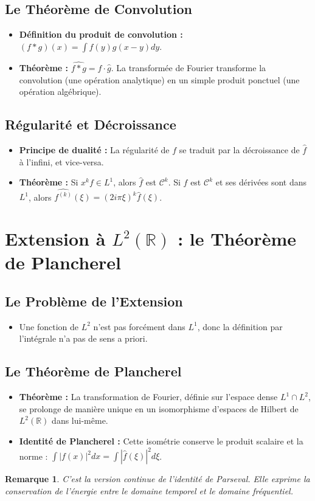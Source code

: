 \documentclass[12pt, a4paper, parskip=full]{report}
\theoremstyle{agregstyle}
\newtheorem{remark}[definition]{Remarque}
\begin{document}
\subsection{Le Théorème de Convolution}
\begin{itemize}
    \item \textbf{Définition du produit de convolution :} $(f*g)(x) = \int f(y)g(x-y)dy$.
    \item \textbf{Théorème :} $\widehat{f*g} = \hat{f} \cdot \hat{g}$. La transformée de Fourier transforme la convolution (une opération analytique) en un simple produit ponctuel (une opération algébrique).
\end{itemize}
\subsection{Régularité et Décroissance}
\begin{itemize}
    \item \textbf{Principe de dualité :} La régularité de $f$ se traduit par la décroissance de $\hat{f}$ à l'infini, et vice-versa.
    \item \textbf{Théorème :} Si $x^k f \in L^1$, alors $\hat{f}$ est $\mathcal{C}^k$. Si $f$ est $\mathcal{C}^k$ et ses dérivées sont dans $L^1$, alors $\widehat{f^{(k)}}(\xi) = (2i\pi\xi)^k \hat{f}(\xi)$.
\end{itemize}

\section{Extension à $L^2(\mathbb{R})$ : le Théorème de Plancherel}
\subsection{Le Problème de l'Extension}
\begin{itemize}
    \item Une fonction de $L^2$ n'est pas forcément dans $L^1$, donc la définition par l'intégrale n'a pas de sens a priori.
\end{itemize}
\subsection{Le Théorème de Plancherel}
\begin{itemize}
    \item \textbf{Théorème :} La transformation de Fourier, définie sur l'espace dense $L^1 \cap L^2$, se prolonge de manière unique en un isomorphisme d'espaces de Hilbert de $L^2(\mathbb{R})$ dans lui-même.
    \item \textbf{Identité de Plancherel :} Cette isométrie conserve le produit scalaire et la norme : $\int |f(x)|^2 dx = \int |\hat{f}(\xi)|^2 d\xi$.
\end{itemize}
\begin{remark}
    C'est la version continue de l'identité de Parseval. Elle exprime la conservation de l'énergie entre le domaine temporel et le domaine fréquentiel.
\end{remark}
\end{document}
